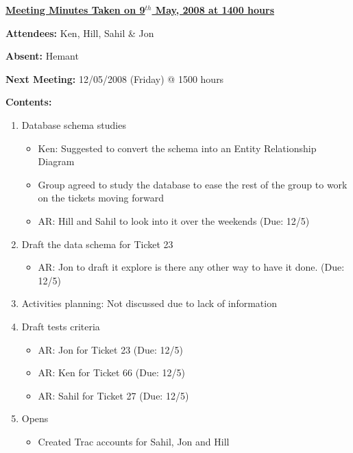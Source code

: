 \documentclass{letter}
\begin{document}
{\large \textbf{\underline{Meeting Minutes Taken on 9$^{th}$ May, 2008 at 1400 hours}}}

\textbf{Attendees:} Ken, Hill, Sahil \& Jon 

\textbf{Absent:} Hemant 

\textbf{Next Meeting:} 12/05/2008 (Friday) @ 1500 hours 

\textbf{Contents:}

\begin{enumerate}
	\item Database schema studies
		\begin{itemize}
			\item Ken: Suggested to convert the schema into an Entity Relationship Diagram
			\item Group agreed to study the database to ease the rest of the group to work on the tickets moving forward
			\item AR: Hill and Sahil to look into it over the weekends (Due: 12/5)
		\end{itemize} 
	\item Draft the data schema for Ticket 23
		\begin{itemize}
			\item AR: Jon to draft it explore is there any other way to have it done. (Due: 12/5)
		\end{itemize}
	\item Activities planning: Not discussed due to lack of information
	\item Draft tests criteria
		\begin{itemize}
			\item AR: Jon for Ticket 23 (Due: 12/5)
			\item AR: Ken for Ticket 66 (Due: 12/5)
			\item AR: Sahil for Ticket 27 (Due: 12/5)
		\end{itemize}
	\item Opens
		\begin{itemize}
			\item Created Trac accounts for Sahil, Jon and Hill
		\end{itemize}
\end{enumerate} 
\end{document}
